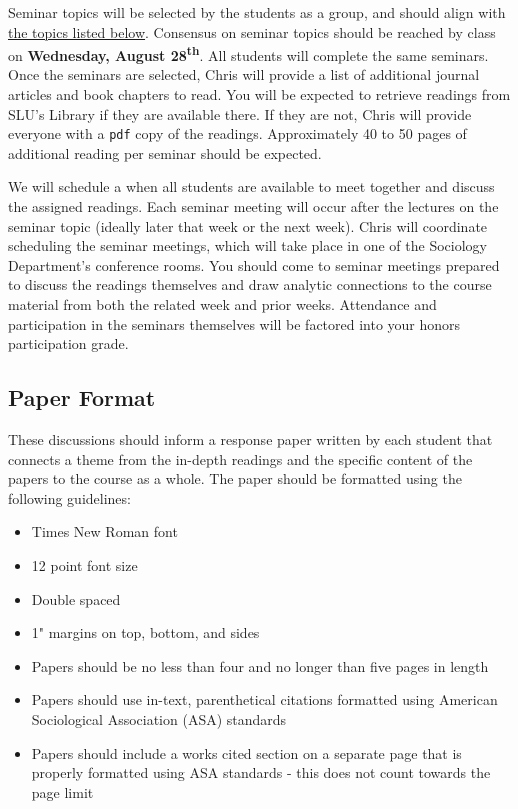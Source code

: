 \documentclass[]{book}
\providecommand{\tightlist}{%
  \setlength{\itemsep}{0pt}\setlength{\parskip}{0pt}}
\begin{document}
Seminar topics will be selected by the students as a group, and should align with \href{/honors-seminar-topics.html}{the topics listed below}. Consensus on seminar topics should be reached by class on \textbf{Wednesday, August 28\textsuperscript{th}}. All students will complete the same seminars. Once the seminars are selected, Chris will provide a list of additional journal articles and book chapters to read. You will be expected to retrieve readings from SLU's Library if they are available there. If they are not, Chris will provide everyone with a \texttt{pdf} copy of the readings. Approximately 40 to 50 pages of additional reading per seminar should be expected.

We will schedule a when all students are available to meet together and discuss the assigned readings. Each seminar meeting will occur after the lectures on the seminar topic (ideally later that week or the next week). Chris will coordinate scheduling the seminar meetings, which will take place in one of the Sociology Department's conference rooms. You should come to seminar meetings prepared to discuss the readings themselves and draw analytic connections to the course material from both the related week and prior weeks. Attendance and participation in the seminars themselves will be factored into your honors participation grade.

\hypertarget{paper-format}{%
\subsection{Paper Format}\label{paper-format}}

These discussions should inform a response paper written by each student that connects a theme from the in-depth readings and the specific content of the papers to the course as a whole. The paper should be formatted using the following guidelines:

\begin{itemize}
\tightlist
\item
  Times New Roman font
\item
  12 point font size
\item
  Double spaced
\item
  1" margins on top, bottom, and sides
\item
  Papers should be no less than four and no longer than five pages in length
\item
  Papers should use in-text, parenthetical citations formatted using American Sociological Association (ASA) standards
\item
  Papers should include a works cited section on a separate page that is properly formatted using ASA standards - this does not count towards the page limit
\end{itemize}
\end{document}
